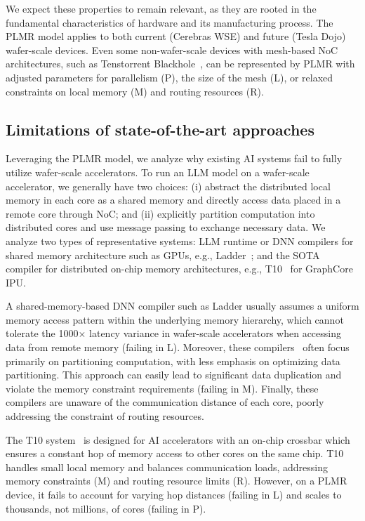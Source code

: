 We expect these properties to remain relevant, as they are rooted in the fundamental characteristics of hardware and its manufacturing process. The PLMR model applies to both current (Cerebras WSE) and future (Tesla Dojo) wafer-scale devices. Even some non-wafer-scale devices with mesh-based NoC architectures, such as Tenstorrent Blackhole~\cite{tenstorrent}, can be represented by PLMR with adjusted parameters for parallelism (P), the size of the mesh (L), or relaxed constraints on local memory (M) and routing resources (R).


    \vspace{-3mm}
\subsection{Limitations of state-of-the-art approaches}
    \vspace{-1mm}
    
Leveraging the PLMR model, we analyze why existing AI systems fail to fully utilize wafer-scale accelerators.
To run an LLM model on a wafer-scale accelerator, we generally have two choices: (i) abstract the distributed local memory in each core as a shared memory and directly access data placed in a remote core through NoC; and (ii) explicitly partition computation into distributed cores and use message passing to exchange necessary data. 
We analyze two types of representative systems: LLM runtime or DNN compilers for shared memory architecture such as GPUs, e.g., Ladder~\cite{ladder}; and the SOTA compiler for distributed on-chip memory architectures, e.g., T10~\cite{t10} for GraphCore IPU.

A shared-memory-based DNN compiler such as Ladder usually assumes a uniform memory access pattern within the underlying memory hierarchy, which cannot tolerate the 1000$\times$ latency variance in wafer-scale accelerators when accessing data from remote memory (failing in L).
Moreover, these compilers~\cite{tvm,rammer,ansor,flextensor,roller,welder,ladder} often focus primarily on partitioning computation, with less emphasis on optimizing data partitioning. This approach can easily lead to significant data duplication and violate the memory constraint requirements (failing in M).
Finally, these compilers are unaware of the communication distance of each core, poorly addressing the constraint of routing resources.

 The T10 system~\cite{t10} is designed for AI accelerators with an on-chip crossbar which ensures a constant hop of memory access to other cores on the same chip. T10 handles small local memory and balances communication loads, addressing memory constraints (M) and routing resource limits (R). However, on a PLMR device, it fails to account for varying hop distances (failing in L) and scales to thousands, not millions, of cores (failing in P).